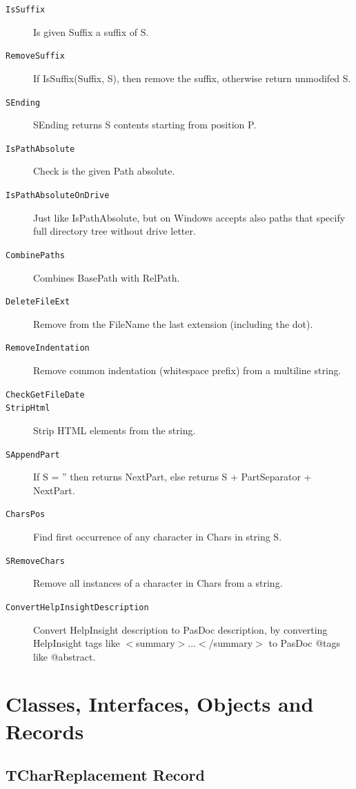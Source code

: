 \documentclass{report}
\newif\ifpdf
\begin{document}
\begin{description}
\item[\texttt{IsSuffix}]Is given Suffix a suffix of S.
\item[\texttt{RemoveSuffix}]If IsSuffix(Suffix, S), then remove the suffix, otherwise return unmodifed S.
\item[\texttt{SEnding}]SEnding returns S contents starting from position P.
\item[\texttt{IsPathAbsolute}]Check is the given Path absolute.
\item[\texttt{IsPathAbsoluteOnDrive}]Just like IsPathAbsolute, but on Windows accepts also paths that specify full directory tree without drive letter.
\item[\texttt{CombinePaths}]Combines BasePath with RelPath.
\item[\texttt{DeleteFileExt}]Remove from the FileName the last extension (including the dot).
\item[\texttt{RemoveIndentation}]Remove common indentation (whitespace prefix) from a multiline string.
\item[\texttt{CheckGetFileDate}]
\item[\texttt{StripHtml}]Strip HTML elements from the string.
\item[\texttt{SAppendPart}]If S = '' then returns NextPart, else returns S + PartSeparator + NextPart.
\item[\texttt{CharsPos}]Find first occurrence of any character in Chars in string S.
\item[\texttt{SRemoveChars}]Remove all instances of a character in Chars from a string.
\item[\texttt{ConvertHelpInsightDescription}]Convert HelpInsight description to PasDoc description, by converting HelpInsight tags like {$<$}summary{$>$}...{$<$}/summary{$>$} to PasDoc @tags like @abstract.
\end{description}
\section{Classes, Interfaces, Objects and Records}
\ifpdf
\subsection*{\large{\textbf{TCharReplacement Record}}\normalsize\hspace{1ex}\hrulefill}
\else
\subsection*{TCharReplacement Record}
\fi
\label{PasDoc_Utils.TCharReplacement}
\end{document}
